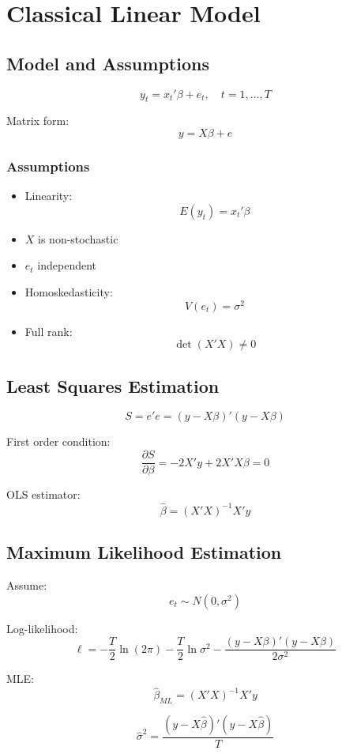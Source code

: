 \chapter{Classical Linear Model}

\section{Model and Assumptions}

\[
y_t = x_t' \beta + e_t, \quad t=1,\dots,T
\]

Matrix form:
\[
y = X\beta + e
\]

\subsection{Assumptions}

\begin{itemize}
    \item[A1] Linearity:
    \[
    E(y_t) = x_t' \beta
    \]
    \item[A2] $X$ is non-stochastic
    \item[A3] $e_t$ independent
    \item[A4] Homoskedasticity:
    \[
    V(e_t)=\sigma^2
    \]
    \item[A5] Full rank:
    \[
    \det(X'X) \neq 0
    \]
\end{itemize}

\section{Least Squares Estimation}

\[
S = e'e = (y - X\beta)'(y - X\beta)
\]

First order condition:
\[
\frac{\partial S}{\partial \beta} = -2X'y + 2X'X\beta = 0
\]

OLS estimator:
\[
\hat{\beta} = (X'X)^{-1}X'y
\]

\section{Maximum Likelihood Estimation}

Assume:
\[
e_t \sim N(0,\sigma^2)
\]

Log-likelihood:
\[
\ell = -\frac{T}{2}\ln(2\pi) - \frac{T}{2}\ln\sigma^2 - \frac{(y-X\beta)'(y-X\beta)}{2\sigma^2}
\]

MLE:
\[
\hat{\beta}_{ML} = (X'X)^{-1}X'y
\]

\[
\hat{\sigma}^2 = \frac{(y-X\hat{\beta})'(y-X\hat{\beta})}{T}
\]

